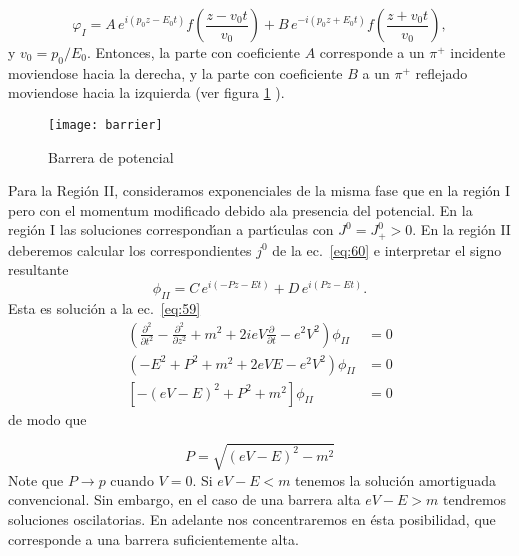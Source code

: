 \begin{equation}
  \varphi_I = A\,e^{i(p_0z-E_0t)}f\left(\frac{z-v_0t}{v_0}\right)+B\,e^{-i(p_0z+E_0t)}f\left(\frac{z+v_0t}{v_0}\right),
\end{equation}
y $v_0=p_0/E_0$. Entonces, la parte con coeficiente $A$ corresponde a un $\pi^+$ incidente moviendose hacia la derecha, y la parte con coeficiente $B$ a un $\pi^+$ reflejado moviendose hacia la izquierda (ver figura \ref{fig:barrier} ).
\begin{figure} %
  \centering %
  \texttt{[image: barrier]} %
  \caption{Barrera de potencial} %
  \label{fig:barrier} %
\end{figure}  %

Para la Regi\'on II, consideramos exponenciales de la misma fase que en la regi\'on I pero  con el momentum modificado debido ala presencia del potencial. En la regi\'on I las soluciones correspond\'\i an a part\'\i culas con $J^0=J^0_+\gt 0$. En la regi\'on II deberemos calcular los correspondientes $j^0$ de la ec.~\eqref{eq:60} e interpretar el signo resultante
\begin{equation}
  \label{eq:249}
  \phi_{II}=C\,e^{i(-Pz-Et)}+D\,e^{i(Pz-Et)}.
\end{equation}
Esta es soluci\'on a la ec.~\eqref{eq:59}
\begin{align}
  \left(\frac{\partial^2}{\partial t^2}-\frac{\partial^2}{\partial z^2}+m^2+2ieV\frac{\partial}{\partial t}-e^2V^2\right)\phi_{II}&=0\nonumber\\
  \left(-E^2+P^2+m^2+2eVE-e^2V^2\right)\phi_{II}&=0\nonumber\\
  \left[-(eV-E)^2+P^2+m^2\right]\phi_{II}&=0
\end{align}
de modo que

\begin{equation}
  P=\sqrt{(eV-E)^2-m^2}
\end{equation}
Note que $P\to p$ cuando $V=0$. Si $eV-E\lt m$ tenemos la soluci\'on amortiguada convencional. Sin embargo, en el caso de una barrera alta $eV-E\gt m$ tendremos soluciones oscilatorias. En adelante nos concentraremos en \'esta posibilidad, que corresponde a una barrera suficientemente alta.


